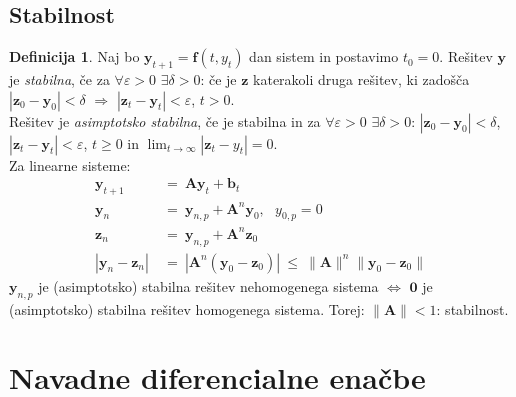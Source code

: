 \documentclass[11pt]{article}
\renewcommand{\b}{\mathbf{b}}
\newcommand{\f}{\mathbf{f}}
\newcommand{\y}{\mathbf{y}}
\newcommand{\z}{\mathbf{z}}
\newcommand{\A}{\mathbf{A}}
\theoremstyle{definition}
\newtheorem{definicija}{Definicija}[section]
\theoremstyle{definition}
\theoremstyle{definition}
\theoremstyle{definition}
\begin{document}

\subsection{Stabilnost}
\vspace{0.5cm}

\begin{definicija}

Naj bo $\y_{t+1} = \f(t,y_t)$ dan sistem in postavimo $t_0 = 0$. Rešitev $\y$ je \textit{stabilna}, če za $\forall \varepsilon > 0$ $\exists \delta > 0$: če je $\z$ katerakoli druga rešitev, ki zadošča $|\z_0 - \y_0| < \delta$ $\Rightarrow$ $|\z_t - \y_t| < \varepsilon$, $t>0$. \\

\noindent Rešitev je \textit{asimptotsko stabilna}, če je stabilna in za $\forall \varepsilon>0$ $\exists \delta>0$: \hbox{$|\z_0 - \y_0| < \delta$}, $|\z_t - \y_t| < \varepsilon$, $t\geq 0$ in $\lim_{t \rightarrow \infty} |\z_t - y_t| = 0$. \\

\noindent Za linearne sisteme:
\begin{align*}
\y_{t+1} ~&=~ \A \y_t + \b_t \\
\y_n ~&=~ \y_{n,p} + \A^n \y_0, ~~~y_{0,p} = 0 \\
\z_n ~&=~ \y_{n,p} + \A^n \z_0 \\
|\y_n - \z_n| ~&=~ |\A^n(\y_0 - \z_0)| ~\leq~ \|\A\|^n \|\y_0 - \z_0\|
\end{align*}
$\y_{n,p}$ je (asimptotsko) stabilna rešitev nehomogenega sistema $\iff$ $\mathbf{0}$ je (asimptotsko) stabilna rešitev homogenega sistema. Torej: $\|\A\| <1$: stabilnost.

\end{definicija}
\vspace{0.5cm}


\pagebreak


\section{Navadne diferencialne enačbe}
\vspace{0.5cm}
\end{document}
